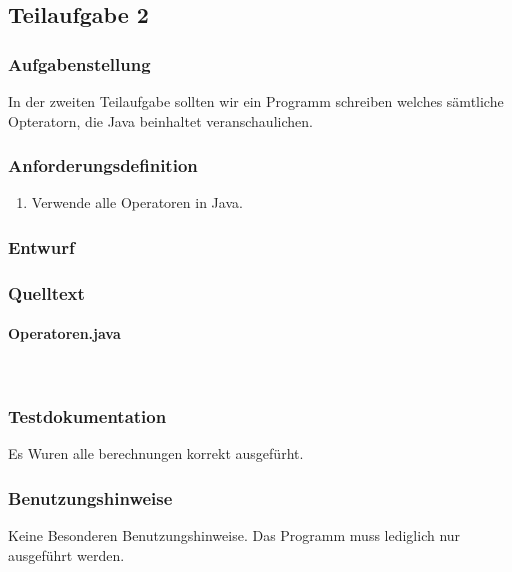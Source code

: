 \subsection{Teilaufgabe 2}
\subsubsection{Aufgabenstellung}
In der zweiten Teilaufgabe sollten wir ein Programm schreiben welches sämtliche Opteratorn,
die Java beinhaltet veranschaulichen.

\subsubsection{Anforderungsdefinition}
\begin{enumerate}
	\item Verwende alle Operatoren in Java.
\end{enumerate}

\subsubsection{Entwurf}


\subsubsection{Quelltext}
\paragraph{Operatoren.java}\


\subsubsection{Testdokumentation}
Es Wuren alle berechnungen korrekt ausgefürht.

\subsubsection{Benutzungshinweise}
Keine Besonderen Benutzungshinweise.
Das Programm muss lediglich nur ausgeführt werden.

